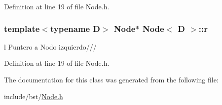 Definition at line 19 of file Node.\+h.

\hypertarget{class_node_a61cefac7cf9a73b5057968706f6931fe}{
\subsubsection[{r}]{\setlength{\rightskip}{0pt plus 5cm}template$<$typename D$>$ {\bf Node}$\ast$ {\bf Node}$<$ {\bf D} $>$\+::r}}\label{class_node_a61cefac7cf9a73b5057968706f6931fe}


l Puntero a Nodo izquierdo/// 



Definition at line 19 of file Node.\+h.



The documentation for this class was generated from the following file\+:\begin{DoxyCompactItemize}
\item 
include/bst/\hyperlink{bst_2_node_8h}{Node.\+h}\end{DoxyCompactItemize}
